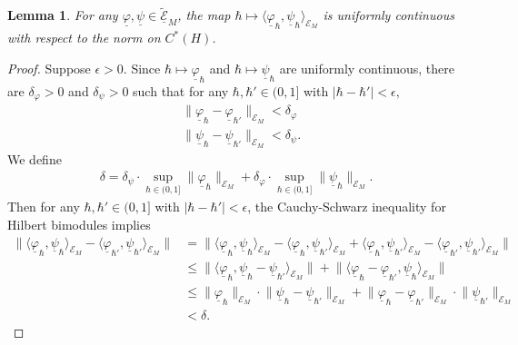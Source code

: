 \documentclass[sn-mathphys,Numbered]{sn-jnl}
\newtheorem{lemma}[theorem]{Lemma}%
\providecommand{\norm}[1]{\lVert#1\rVert}
\providecommand{\abs}[1]{\lvert#1\rvert}
\providecommand{\inner}[2]{\langle#1,#2\rangle}
\begin{document}
\begin{lemma}
\label{lemma:continuity_inner_product}
For any $\underline{\varphi},\underline{\psi}\in\widetilde{\underline{\mathcal{E}}}_M$, the map $\hbar\mapsto \inner{\underline{\varphi}_\hbar}{\underline{\psi}_\hbar}_{\mathcal{E}_M}$ is uniformly continuous with respect to the norm on $C^*(H)$.
\end{lemma}

\begin{proof}
    Suppose $\epsilon>0$.  Since $\hbar\mapsto \underline{\varphi}_\hbar$ and $\hbar\mapsto\underline{\psi}_\hbar$ are uniformly continuous, there are $\delta_\varphi>0$ and $\delta_\psi>0$ such that for any $\hbar,\hbar'\in (0,1]$ with $\abs{\hbar-\hbar'}<\epsilon,$
\begin{align}
    &\norm{\underline{\varphi}_\hbar-\underline{\varphi}_{\hbar'}}_{\mathcal{E}_M}<\delta_\varphi\\
    &\norm{\underline{\psi}_\hbar-\underline{\psi}_{\hbar'}}_{\mathcal{E}_M}<\delta_\psi.
\end{align}
We define
    \begin{align}
        \delta = \delta_\psi\cdot \sup_{\hbar\in (0,1]}\norm{\underline{\varphi}_\hbar}_{\mathcal{E}_M} + \delta_\varphi\cdot \sup_{\hbar\in (0,1]}\norm{\underline{\psi}_\hbar}_{\mathcal{E}_M}.
    \end{align}
    Then for any $\hbar,\hbar'\in (0,1]$ with $\abs{\hbar-\hbar'}<\epsilon$, the Cauchy-Schwarz inequality for Hilbert bimodules \citep[Lemma 2.5]{RaWi98} implies
    \begin{align}
        \norm{\inner{\underline{\varphi}_\hbar}{\underline{\psi}_\hbar}_{\mathcal{E}_M} - \inner{\underline{\varphi}_{\hbar'}}{\underline{\psi}_{\hbar'}}_{\mathcal{E}_M}} &= \norm{\inner{\underline{\varphi}_\hbar}{\underline{\psi}_\hbar}_{\mathcal{E}_M} - \inner{\underline{\varphi}_\hbar}{\underline{\psi}_{\hbar'}}_{\mathcal{E}_M} + \inner{\underline{\varphi}_\hbar}{\underline{\psi}_{\hbar'}}_{\mathcal{E}_M} -\inner{\underline{\varphi}_{\hbar'}}{\underline{\psi}_{\hbar'}}_{\mathcal{E}_M}}\\
        &\leq \norm{\inner{\underline{\varphi}_\hbar}{\underline{\psi}_\hbar-\underline{\psi}_{\hbar'}}_{\mathcal{E}_M}} + \norm{\inner{\underline{\varphi}_\hbar-\underline{\varphi}_{\hbar'}}{\underline{\psi}_\hbar}_{\mathcal{E}_M}}\\
        &\leq \norm{\underline{\varphi}_\hbar}_{\mathcal{E}_M}\cdot \norm{\underline{\psi}_\hbar-\underline{\psi}_{\hbar'}}_{\mathcal{E}_M} + \norm{\underline{\varphi}_\hbar - \underline{\varphi}_{\hbar'}}_{\mathcal{E}_M}\cdot \norm{\underline{\psi}_{\hbar'}}_{\mathcal{E}_M}\\
        &<\delta.
    \end{align}
\end{proof}
\end{document}
